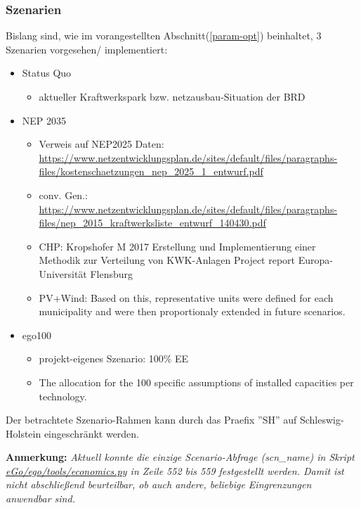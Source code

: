 \documentclass[
a4paper,     %
12pt         %
]{scrartcl}  %
\begin{document}
\subsubsection{Szenarien}
Bislang sind, wie im vorangestellten  Abschnitt(\ref{param-opt}) beinhaltet, 3 Szenarien vorgesehen/ implementiert:
\begin{itemize}
	\item Status Quo
	\begin{itemize}
		\item aktueller Kraftwerkspark bzw. netzausbau-Situation der BRD
	\end{itemize}
	\item NEP 2035
	\begin{itemize}
		\item[] Verweis auf NEP2025 Daten:
		\\\url{https://www.netzentwicklungsplan.de/sites/default/files/paragraphs-files/kostenschaetzungen_nep_2025_1_entwurf.pdf}

		\item[] conv. Gen.: \url{https://www.netzentwicklungsplan.de/sites/default/files/paragraphs-files/nep_2015_kraftwerksliste_entwurf_140430.pdf}
		\item[] CHP: Kropshofer M 2017 Erstellung und Implementierung einer Methodik zur Verteilung von KWK-Anlagen
		Project report Europa-Universität Flensburg
		\item[] PV+Wind: Based on this, representative units were defined for each municipality and
		were then proportionaly extended in future scenarios.

	\end{itemize}
	\item ego100
	\begin{itemize}
		\item projekt-eigenes Szenario: 100\% EE
		\item[]The allocation for the 100%
		specific assumptions of installed capacities per technology.
	\end{itemize}
\end{itemize}
Der betrachtete Szenario-Rahmen kann durch das Praefix ''SH'' auf Schleswig-Holstein  eingeschränkt werden.

\textbf{Anmerkung:} \textit{Aktuell konnte die einzige Scenario-Abfrage (scn\_name) in Skript\\ \url{eGo/ego/tools/economics.py} in Zeile 552 bis 559 festgestellt werden. Damit ist nicht abschließend beurteilbar, ob auch andere, beliebige Eingrenzungen anwendbar sind.}\\
\end{document}
